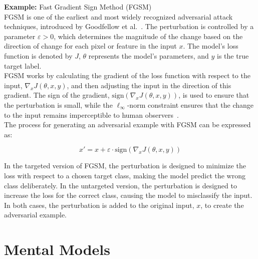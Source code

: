\documentclass[a4paper, oneside]{discothesis}
\begin{document}
\begin{examplebox}
	\textbf{Example:} Fast Gradient Sign Method (FGSM) \\

	FGSM is one of the earliest and most widely recognized adversarial attack techniques, introduced by Goodfellow et al.~\cite{goodfellow2014explaining}. The perturbation is controlled by a parameter $\varepsilon > 0$, which determines the magnitude of the change based on the direction of change for each pixel or feature in the input $x$. The model's loss function is denoted by $J$, $\theta$ represents the model's parameters, and $y$ is the true target label. \\
	
	FGSM works by calculating the gradient of the loss function with respect to the input, $\nabla_x J(\theta, x, y)$, and then adjusting the input in the direction of this gradient. The sign of the gradient, $\text{sign}(\nabla_x J(\theta, x, y))$, is used to ensure that the perturbation is small, while the $\ell_\infty$-norm constraint ensures that the change to the input remains imperceptible to human observers~\cite{zhang2019adversarial}. \\
	
	The process for generating an adversarial example with FGSM can be expressed as:
	
	$$x' = x + \varepsilon \cdot \text{sign}(\nabla_x J(\theta, x, y))$$
	
	In the targeted version of FGSM, the perturbation is designed to minimize the loss with respect to a chosen target class, making the model predict the wrong class deliberately. In the untargeted version, the perturbation is designed to increase the loss for the correct class, causing the model to misclassify the input. In both cases, the perturbation is added to the original input, $x$, to create the adversarial example.
\end{examplebox}







\section{Mental Models}
\end{document}
